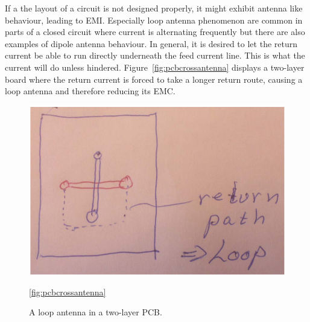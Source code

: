 If a the layout of a circuit is not designed properly, it might exhibit antenna
like behaviour, leading to EMI. Especially loop antenna phenomenon are common in
parts of a closed circuit where current is alternating frequently but there are
also examples of dipole antenna behaviour. In general, it is desired to let the
return current be able to run directly underneath the feed current line. This is
what the current will do unless hindered. Figure~\ref{fig:pcbcrossantenna}
displays a two-layer board where the return current is forced to take a longer
return route, causing a loop antenna and therefore reducing its EMC.
\begin{figure}[H]
\centering
\includegraphics[scale=0.7]{./figures/FIG_pcbcrossantenna}
\caption{A loop antenna in a two-layer PCB.}
\ref{fig:pcbcrossantenna}
\end{figure}

